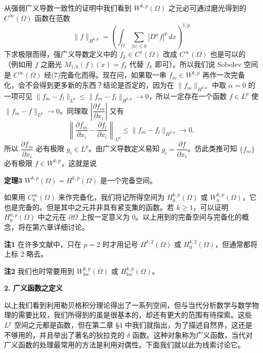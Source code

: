 从强弱广义导数一致性的证明中我们看到 $W^{k,p}(\Omega)$ 之元必可通过磨光得到的 $C^\infty(\Omega)$ 函数在范数
\begin{equation}
 \|f\|_{H^{k,p}}=
 \left(\int_\Omega\sum_{|\alpha|\le k}|D^\alpha f|^p\,dx\right)^{1/p}
 \tag{7}
\end{equation}
下求极限而得，强广义导数定义中的 $f_k\in C^1(\Omega)$ 改成 $C^\infty(\Omega)$ 也是可以的（例如用 $f$ 之磨光 $M_{1/k}(f)(x)=f_k$ 代替 $f_k$ 即可）。所以我们说 Sobolev 空间是 $C^\infty(\Omega)$ 经(7)完备化而得。现在问，如果取一串 $f_m\in W^{k,p}$ 再作一次完备化，会不会得到更多新的东西？结论是否定的，因为在 $\|f_m\|_{H^{k,p}}$ 中取 $\alpha=0$ 的一项可见 $\|f_m-f_l\|_{L^p}\le\|f_m-f_l\|_{H^{k,p}}\to0$，所以一定存在一个函数 $f\in L^p$ 使 $\|f_m-f\|_{L^p}\to0$。同理取 $\left|\dfrac{\partial f_m}{\partial x_i}\right|$ 又有
\[
 \left\|\frac{\partial f_m}{\partial x_i}-\frac{\partial f_l}{\partial x_i}\right\|_{L^p}
 \le\|f_m-f_l\|_{H^{k,p}}\to0,
\]
所以 $\dfrac{\partial f_m}{\partial x_i}$ 必有极限 $g_i\in L^p$。由广义导数定义易知 $g_i=\dfrac{\partial f}{\partial x_i}$。仿此类推可知 $\{f_m\}$ 必有极限 $f\in W^{k,p}$，这就是说

\noindent\textbf{定理3}
$W^{k,p}(\Omega)=H^{k,p}(\Omega)$ 是一个完备空间。

如果用 $C_0^\infty(\Omega)$ 来作完备化，我们将记所得空间为 $H_0^{k,p}(\Omega)$ 或 $W_0^{k,p}(\Omega)$，它也是完备的。但是其中之元并非具有紧支集的函数。若 $k\ge1$，可以证明 $H_0^{k,p}(\Omega)$ 中之元在 $\partial\Omega$ 上按一定意义为 0。以上用到的完备空间与完备化的概念，将在第六章详细讨论。

\noindent\textbf{注1}
在许多文献中，只在 $p=2$ 时才用记号 $H^{k,2}(\Omega)$ 或 $H_0^{k,2}(\Omega)$，但通常都将上标 2 略去。

\noindent\textbf{注2}
我们也时常要用到 $W^{k,p}_{\mathrm{loc}}(\Omega)$ 或 $H^{k,p}_{\mathrm{loc}}(\Omega)$。

\medskip
\noindent\textbf{2. 广义函数之定义}

以上我们看到利用勒贝格积分理论得出了一系列空间，但与当代分析数学与数学物理的需要比较，我们所得到的虽是很基本的，却还有更大的范围有待探索。这些 $L^p$ 空间之元都是函数，但在第二章 §4 中我们就指出，为了描述自然界，这还是不够用的，并且举出了著名的狄拉克的 $\delta$ 函数。这种对象称为广义函数，当代对广义函数的处理最常用的方法是利用对偶性。下面我们就以此为线索讨论它。

